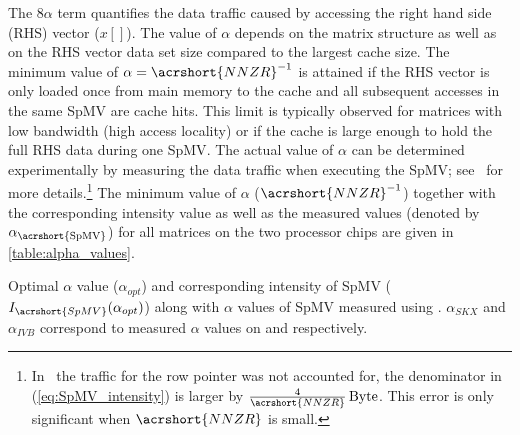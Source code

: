 The $8\alpha$ term quantifies the data traffic caused by accessing the right hand side (RHS) vector ($x[]$). The value of $\alpha$ depends on the matrix structure as well as on the RHS vector data set size compared to the largest cache size. The minimum value of $\alpha=\acrshort{NNZR}^{-1}$ is attained if the RHS vector is only loaded once from main memory to the cache and all subsequent accesses in the same \acrshort{SpMV} are cache hits. This limit is typically observed for matrices with low bandwidth (high access locality) or if the cache is large enough to hold the full RHS data during one \acrshort{SpMV}. The actual value of $\alpha$ can be determined experimentally by measuring the data traffic when executing the \acrshort{SpMV}; see~\cite{Moritz_sell} for more details.\footnote{In~\cite{Moritz_sell} the traffic for the row pointer was not accounted for, \ie the denominator in (\ref{eq:SpMV_intensity}) is larger by $\frac{4}{\acrshort{NNZR}}\,\BYTE$. This error is only significant when $\acrshort{NNZR}$ is small.}  The minimum value of $\alpha$ ($\acrshort{NNZR}^{-1}$) together with the corresponding intensity value as well as the measured values (denoted by $\alpha_\mathrm{\acrshort{SpMV}}$) for all matrices on the two processor chips are given in \cref{table:alpha_values}.
\begin{table}[ht]
	\footnotesize
	\caption{Optimal $\alpha$ value ($\alpha_{opt}$) and corresponding intensity of \acrshort{SpMV} ($I_{\acrshort{SpMV}}(\alpha_{opt})$)  along with $\alpha$ values of SpMV measured using \LIKWID.  $\alpha_{SKX}$ and $\alpha_{IVB}$ correspond to measured $\alpha$ values on \SKX and \IVB respectively.}
	\label{table:alpha_values}
	\begin{center}
		
	\end{center}
\end{table}
 
